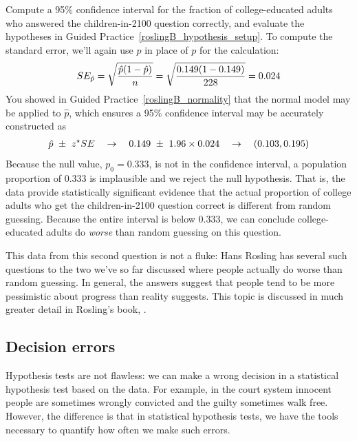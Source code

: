 \begin{example}{Compute a 95\% confidence interval for the
    fraction of college-educated adults who answered the
    children-in-2100 question correctly, and evaluate the
    hypotheses in Guided
    Practice~\ref{roslingB_hypothesis_setup}.}
  To compute the standard error, we'll again use $\hat{p}$
  in place of $p$ for the calculation:
  \begin{align*}
  SE_{\hat{p}}
      = \sqrt{\frac{\hat{p}(1 - \hat{p})}{n}}
      = \sqrt{\frac{0.149{}(1 - 0.149{})}
          {228{}}}
      = 0.024{}
  \end{align*}
  You showed in Guided Practice~\ref{roslingB_normality}
  that the normal model may be applied to $\hat{p}$,
  which ensures a 95\% confidence interval may be accurately
  constructed as
  \begin{align*}
  \hat{p}~\pm~z^{\star}SE
  \quad\to\quad
  0.149{}~\pm~1.96 \times 0.024{}
  \quad\to\quad
  (0.103, 0.195)
  \end{align*}
  Because the null value, $p_0 = 0.333$, is not in the
  confidence interval, a population proportion of 0.333
  is implausible and we reject the null hypothesis.
  That is, the data provide statistically significant
  evidence that the actual proportion of college adults
  who get the children-in-2100 question correct is
  different from random guessing. Because the entire interval
  is below 0.333, we can conclude college-educated adults
  do \emph{worse} than random guessing on this question.
\end{example}

This data from this second question is not a fluke:
Hans Rosling has several such questions
to the two we've so far discussed where people
actually do worse than random guessing.
In general, the answers suggest that people tend to be
more pessimistic about progress than reality suggests.
This topic is discussed in much greater detail in
Rosling's book,
\emph{}.



\subsection{Decision errors}


Hypothesis tests are not flawless: we can make a wrong
decision in a statistical hypothesis test based on the data.
For example, in the court system innocent people are
sometimes wrongly convicted and the guilty sometimes walk free.
However, the difference is that in statistical hypothesis tests,
we have the tools necessary to quantify how often we make
such errors.

